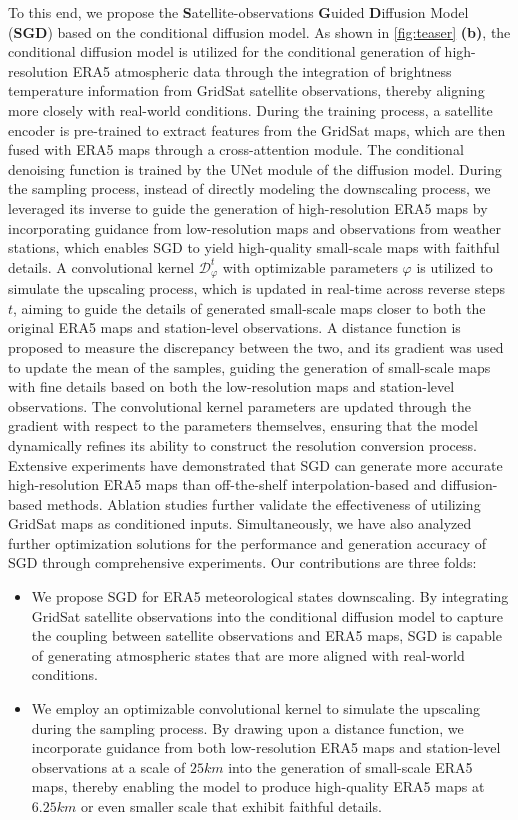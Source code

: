 To this end, we propose the \textbf{S}atellite-observations \textbf{G}uided \textbf{D}iffusion Model (\textbf{SGD}) based on the conditional diffusion model. 
As shown in \cref{fig:teaser} \textbf{(b)}, the conditional diffusion model is utilized for the conditional generation of high-resolution ERA5 atmospheric data through the integration of brightness temperature information from GridSat satellite observations, thereby aligning more closely with real-world conditions. 
During the training process, a satellite encoder is pre-trained to extract features from the GridSat maps, which are then fused with ERA5 maps through a cross-attention module. 
The conditional denoising function is trained by the UNet module of the diffusion model. 
During the sampling process, instead of directly modeling the downscaling process, we leveraged its inverse to guide the generation of high-resolution ERA5 maps by incorporating guidance from low-resolution maps and observations from weather stations, which enables SGD to yield high-quality small-scale maps with faithful details.
A convolutional kernel $\mathcal{D}^t_{\varphi}$ with optimizable parameters ${\varphi}$ is utilized to simulate the upscaling process, which is updated in real-time across reverse steps $t$, aiming to guide the details of generated small-scale maps closer to both the original ERA5 maps and station-level observations. 
A distance function is proposed to measure the discrepancy between the two, and its gradient was used to update the mean of the samples, guiding the generation of small-scale maps with fine details based on both the low-resolution maps and station-level observations. 
The convolutional kernel parameters are updated through the gradient with respect to the parameters themselves, ensuring that the model dynamically refines its ability to construct the resolution conversion process. 
Extensive experiments have demonstrated that SGD can generate more accurate high-resolution ERA5 maps than off-the-shelf interpolation-based and diffusion-based methods. 
Ablation studies further validate the effectiveness of utilizing GridSat maps as conditioned inputs. 
Simultaneously, we have also analyzed further optimization solutions for the performance and generation accuracy of SGD through comprehensive experiments. 
Our contributions are three folds:
\begin{itemize}
\item 
We propose SGD for ERA5 meteorological states downscaling. 
By integrating GridSat satellite observations into the conditional diffusion model to capture the coupling between satellite observations and ERA5 maps, SGD is capable of generating atmospheric states that are more aligned with real-world conditions. 
\item
We employ an optimizable convolutional kernel to simulate the upscaling during the sampling process. 
By drawing upon a distance function, we incorporate guidance from both low-resolution ERA5 maps and station-level observations at a scale of $25km$ into the generation of small-scale ERA5 maps, thereby enabling the model to produce high-quality ERA5 maps at $6.25km$ or even smaller scale that exhibit faithful details. 
\end{itemize}

